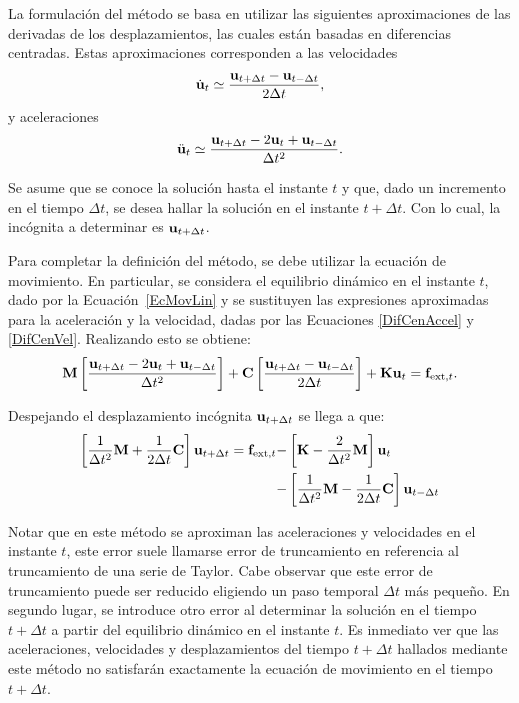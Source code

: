La formulación del método se basa en utilizar las siguientes aproximaciones de las derivadas de los desplazamientos, las cuales están basadas en diferencias centradas. Estas aproximaciones corresponden a las velocidades
%
\begin{equation}\label{DifCenVel}
\dot{{\bf u}}_t \simeq \frac{{\bf u}_{t+\Delta t}-{\bf u}_{t-\Delta t}}{2\Delta t},
\end{equation}
y aceleraciones
\begin{equation}\label{DifCenAccel}
	\ddot{{\bf u}}_t \simeq \frac{{\bf u}_{t+\Delta t}-2{\bf u}_{t}+{\bf u}_{t-\Delta t}}{\Delta t ^2}.
\end{equation}

Se asume que se conoce la solución hasta el instante $t$ y que, dado un incremento en el tiempo $\Delta t$, se desea hallar la solución en el instante $t+\Delta t$. %
%
Con lo cual, la incógnita a determinar es ${\bf u}_{t+\Delta t}$.

Para completar la definición del método, se debe utilizar la ecuación de movimiento. %
%
En particular, se considera el equilibrio dinámico en el instante $t$, dado por la Ecuación~\eqref{EcMovLin} y se sustituyen las expresiones aproximadas para la aceleración y la velocidad, dadas por las Ecuaciones \eqref{DifCenAccel} y \eqref{DifCenVel}. %
%
Realizando esto se obtiene:
%
\begin{equation}
{\bf M} \left[\frac{{\bf u}_{t+\Delta t}-2{\bf u}_{t}+{\bf u}_{t-\Delta t}}{\Delta t ^2}\right] + {\bf C} \left[\frac{{\bf u}_{t+\Delta t}-{\bf u}_{t-\Delta t}}{2\Delta t}\right] + {\bf K} {\bf u}_t = {\bf f}_{\text{ext},t}.
\end{equation}

Despejando el desplazamiento incógnita ${\bf u}_{t+\Delta t}$ se llega a que:
%
\begin{equation}\label{EcDifCent}
\begin{split}
	\left[\frac{1}{\Delta t^2}{\bf M} + \frac{1}{2\Delta t}{\bf C} \right] {\bf u}_{t+\Delta t} = {\bf f}_{\text{ext},t} - & \left[{\bf K}-\frac{2}{\Delta t ^2}{\bf M}\right] {\bf u}_t \\
	-& \left[\frac{1}{\Delta t^2}{\bf M}-\frac{1}{2\Delta t}{\bf C}\right] {\bf u}_{t-\Delta t}
\end{split}
\end{equation}

Notar que en este método se aproximan las aceleraciones y velocidades en el instante $t$, este error suele llamarse error de truncamiento en referencia al truncamiento de una serie de Taylor. %
%
Cabe observar que este error de truncamiento puede ser reducido eligiendo un paso temporal $\Delta t$ más pequeño. %
%
En segundo lugar, se introduce otro error al determinar la solución en el tiempo $t+\Delta t$ a partir del equilibrio dinámico en el instante $t$. Es inmediato ver que las aceleraciones, velocidades y desplazamientos del tiempo $t+\Delta t$ hallados mediante este método no satisfarán exactamente la ecuación de movimiento en el tiempo $t + \Delta t$.


